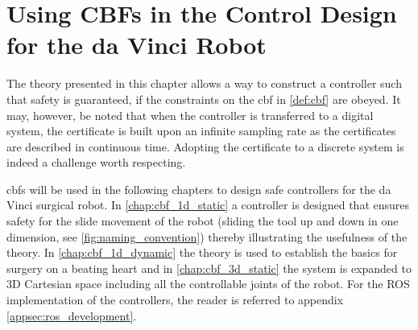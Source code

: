 \section{Using CBFs in the Control Design for the da Vinci Robot}
The theory presented in this chapter allows a way to construct a controller such that safety is guaranteed, if the constraints on the \gls{cbf} in \autoref{def:cbf} are obeyed.
It may, however, be noted that when the controller is transferred to a digital system, the certificate is built upon an infinite sampling rate as the certificates are described in continuous time. Adopting the certificate to a discrete system is indeed a challenge worth respecting. 


\glspl{cbf} will be used in the following chapters to design safe controllers for the da Vinci surgical robot. In \autoref{chap:cbf_1d_static} a controller is designed that ensures safety for the slide movement of the robot (sliding the tool up and down in one dimension, see \autoref{fig:naming_convention})  thereby illustrating the usefulness of the theory. In \autoref{chap:cbf_1d_dynamic} the theory is used to establish the basics for surgery on a beating heart and in  \autoref{chap:cbf_3d_static} the system is  expanded to 3D Cartesian space including all the controllable joints of the robot. For the ROS implementation of the controllers, the reader is referred to appendix \ref{appsec:ros_development}.



